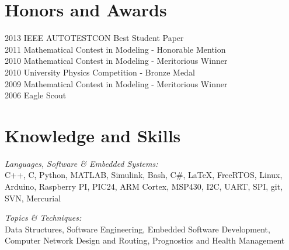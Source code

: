 \documentclass[line,margin]{res}
\begin{document}
\begin{resume}

\clearpage

\section{Honors and Awards}           
			2013 IEEE AUTOTESTCON Best Student Paper \\  
			2011 Mathematical Contest in Modeling - Honorable Mention \\
            2010 Mathematical Contest in Modeling - Meritorious Winner \\
            2010 University Physics Competition - Bronze Medal \\
			2009 Mathematical Contest in Modeling - Meritorious Winner \\
            2006 Eagle Scout
            
\section{Knowledge and Skills} {\sl Languages, Software \& Embedded Systems:}\\
				C++, C, Python, MATLAB, Simulink, Bash, C\#, \LaTeX, FreeRTOS, Linux, Arduino, Raspberry PI, PIC24, ARM Cortex, MSP430, I2C, UART, SPI, git, SVN, Mercurial
                
                {\sl Topics \& Techniques:}\\Data Structures, Software Engineering, Embedded Software Development, Computer Network Design and Routing, Prognostics and Health Management
                

\end{resume}
\end{document}
